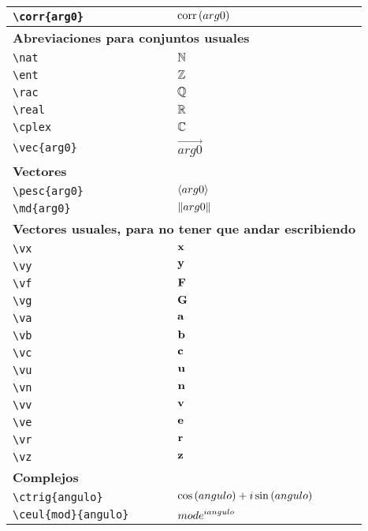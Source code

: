 \begin{longtable}{|p{3.5cm}|p{2cm}|}
\verb|\corr{arg0}| & $\displaystyle\mathrm{corr}\left(arg0\right)$ \\ \midrule 
\bottomrule \multicolumn{2}{|p{5.5cm}|}{\textbf{Abreviaciones para conjuntos usuales}} \\ \toprule 
\verb|\nat| & $\displaystyle\mathbb{N}$ \\ \midrule 
\verb|\ent| & $\displaystyle\mathbb{Z}$ \\ \midrule 
\verb|\rac| & $\displaystyle\mathbb{Q}$ \\ \midrule 
\verb|\real| & $\displaystyle\mathbb{R}$ \\ \midrule 
\verb|\cplex| & $\displaystyle\mathbb{C}$ \\ \midrule 
\verb|\vec{arg0}| & $\displaystyle\vec{arg0}$ \\ \midrule 
\bottomrule \multicolumn{2}{|p{5.5cm}|}{\textbf{Vectores}} \\ \toprule 
\verb|\pesc{arg0}| & $\displaystyle\langle arg0 \rangle$ \\ \midrule 
\verb|\md{arg0}| & $\displaystyle\| arg0 \|$ \\ \midrule 
\bottomrule \multicolumn{2}{|p{5.5cm}|}{\textbf{Vectores usuales, para no tener que andar escribiendo}} \\ \toprule 
\verb|\vx| & $\displaystyle\bold{x}$ \\ \midrule 
\verb|\vy| & $\displaystyle\bold{y}$ \\ \midrule 
\verb|\vf| & $\displaystyle\bold{F}$ \\ \midrule 
\verb|\vg| & $\displaystyle\bold{G}$ \\ \midrule 
\verb|\va| & $\displaystyle\bold{a}$ \\ \midrule 
\verb|\vb| & $\displaystyle\bold{b}$ \\ \midrule 
\verb|\vc| & $\displaystyle\bold{c}$ \\ \midrule 
\verb|\vu| & $\displaystyle\bold{u}$ \\ \midrule 
\verb|\vn| & $\displaystyle\bold{n}$ \\ \midrule 
\verb|\vv| & $\displaystyle\bold{v}$ \\ \midrule 
\verb|\ve| & $\displaystyle\bold{e}$ \\ \midrule 
\verb|\vr| & $\displaystyle\bold{r}$ \\ \midrule 
\verb|\vz| & $\displaystyle\bold{z}$ \\ \midrule 
\bottomrule \multicolumn{2}{|p{5.5cm}|}{\textbf{Complejos}} \\ \toprule 
\verb|\ctrig{angulo}| & $\displaystyle\cos \left(angulo\right) + i \sin \left(angulo\right)$ \\ \midrule 
\verb|\ceul{mod}{angulo}| & $\displaystyle mod e^{i angulo}$ \\ \midrule 

\end{longtable}
